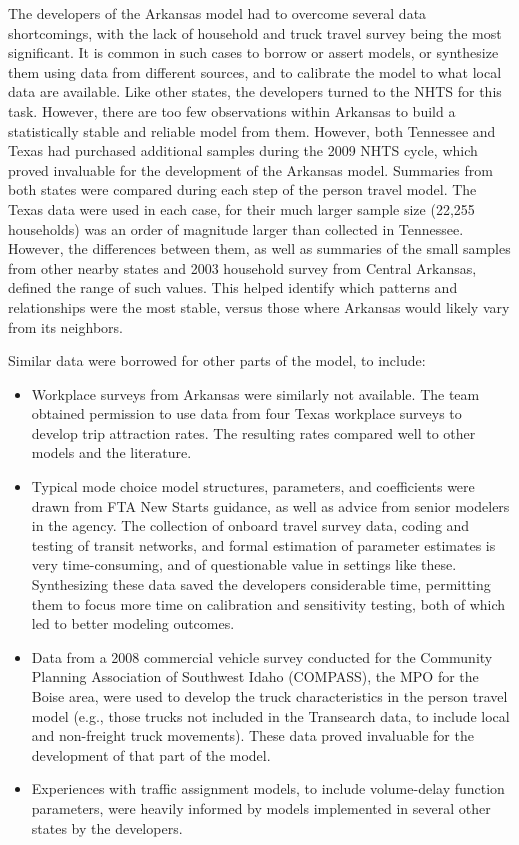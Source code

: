 The developers of the Arkansas model had to overcome several data shortcomings, with the lack of household and truck travel survey being the most significant. It is common in such cases to borrow or assert models, or synthesize them using data from different sources, and to calibrate the model to what local data are available. Like other states, the developers turned to the NHTS for this task. However, there are too few observations within Arkansas to build a statistically stable and reliable model from them. However, both Tennessee and Texas had purchased additional samples during the 2009 NHTS cycle, which proved invaluable for the development of the Arkansas model. Summaries from both states were compared during each step of the person travel model. The Texas data were used in each case, for their much larger sample size (22,255 households) was an order of magnitude larger than collected in Tennessee. However, the differences between them, as well as summaries of the small samples from other nearby states and 2003 household survey from Central Arkansas, defined the range of such values. This helped identify which patterns and relationships were the most stable, versus those where Arkansas would likely vary from its neighbors.

Similar data were borrowed for other parts of the model, to include:
\begin{itemize}
\item
Workplace surveys from Arkansas were similarly not available. The team obtained permission to use data from four Texas workplace surveys to develop trip attraction rates. The resulting rates compared well to other models and the literature.
\item
Typical mode choice model structures, parameters, and coefficients were drawn from FTA New Starts guidance, as well as advice from senior modelers in the agency. The collection of onboard travel survey data, coding and testing of transit networks, and formal estimation of parameter estimates is very time-consuming, and of questionable value in settings like these. Synthesizing these data saved the developers considerable time, permitting them to focus more time on calibration and sensitivity testing, both of which led to better modeling outcomes.
\item
Data from a 2008 commercial vehicle survey conducted for the Community Planning Association of Southwest Idaho (COMPASS), the MPO for the Boise area, were used to develop the truck characteristics in the person travel model (e.g., those trucks not included in the Transearch data, to include local and non-freight truck movements). These data proved invaluable for the development of that part of the model.
\item
Experiences with traffic assignment models, to include volume-delay function parameters, were heavily informed by models implemented in several other states by the developers.
\end{itemize}

